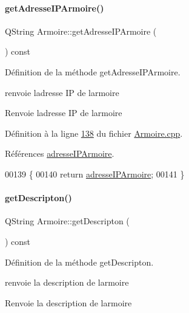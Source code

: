 \paragraph{\texorpdfstring{get\+Adresse\+I\+P\+Armoire()}{getAdresseIPArmoire()}}
{\footnotesize\ttfamily Q\+String Armoire\+::get\+Adresse\+I\+P\+Armoire (\begin{DoxyParamCaption}{ }\end{DoxyParamCaption}) const}



Définition de la méthode get\+Adresse\+I\+P\+Armoire. 

renvoie l\textquotesingle{}adresse IP de l\textquotesingle{}armoire \begin{DoxyReturn}{Renvoie}
l\textquotesingle{}adresse IP de l\textquotesingle{}armoire 
\end{DoxyReturn}


Définition à la ligne \hyperlink{_armoire_8cpp_source_l00138}{138} du fichier \hyperlink{_armoire_8cpp_source}{Armoire.\+cpp}.



Références \hyperlink{_armoire_8h_source_l00070}{adresse\+I\+P\+Armoire}.


\begin{DoxyCode}
00139 \{
00140     \textcolor{keywordflow}{return} \hyperlink{class_armoire_ab96bd042aa78eaefba0aefb860684ca6}{adresseIPArmoire};
00141 \}
\end{DoxyCode}
\mbox{\label{class_armoire_a19af26aa7dedd03202d2484744dcad76}} 
\paragraph{\texorpdfstring{get\+Descripton()}{getDescripton()}}
{\footnotesize\ttfamily Q\+String Armoire\+::get\+Descripton (\begin{DoxyParamCaption}{ }\end{DoxyParamCaption}) const}



Définition de la méthode get\+Descripton. 

renvoie la description de l\textquotesingle{}armoire \begin{DoxyReturn}{Renvoie}
la description de l\textquotesingle{}armoire 
\end{DoxyReturn}


